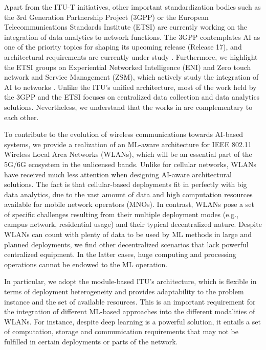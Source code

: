 \documentclass[journal]{IEEEtran}
\begin{document}
Apart from the ITU-T initiatives, other important standardization bodies such as the 3rd Generation Partnership Project (3GPP) or the European Telecommunications Standards Institute (ETSI) are currently working on the integration of data analytics to network functions. The 3GPP contemplates AI as one of the priority topics for shaping its upcoming release (Release 17), and architectural requirements are currently under study \cite{3gpp2019study}. Furthermore, we highlight the ETSI groups on Experiential Networked Intelligence (ENI) and Zero touch network and Service Management (ZSM), which actively study the integration of AI to networks \cite{etsi2019architecture}. Unlike the ITU's unified architecture, most of the work held by the 3GPP and the ETSI focuses on centralized data collection and data analytics solutions. Nevertheless, we understand that the works in \cite{itu2019architecture, 3gpp2019study, etsi2019architecture} are complementary to each other.

To contribute to the evolution of wireless communications towards AI-based systems, we provide a realization of an ML-aware architecture for IEEE 802.11 Wireless Local Area Networks (WLANs), which will be an essential part of the 5G/6G ecosystem in the unlicensed bands. Unlike for cellular networks, WLANs have received much less attention when designing AI-aware architectural solutions. The fact is that cellular-based deployments fit in perfectly with big data analytics, due to the vast amount of data and high computation resources available for mobile network operators (MNOs). In contrast, WLANs pose a set of specific challenges resulting from their multiple deployment modes (e.g., campus network, residential usage) and their typical decentralized nature. Despite WLANs can count with plenty of data to be used by ML methods in large and planned deployments, we find other decentralized scenarios that lack powerful centralized equipment. In the latter cases, huge computing and processing operations cannot be endowed to the ML operation.

In particular, we adopt the module-based ITU's architecture, which is flexible in terms of deployment heterogeneity and provides adaptability to the problem instance and the set of available resources. This is an important requirement for the integration of different ML-based approaches into the different modalities of WLANs. For instance, despite deep learning is a powerful solution, it entails a set of computation, storage and communication requirements that may not be fulfilled in certain deployments or parts of the network.
\end{document}
